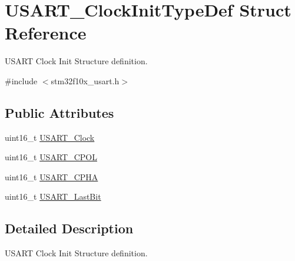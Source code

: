 \hypertarget{structUSART__ClockInitTypeDef}{
\section{USART\_\-ClockInitTypeDef Struct Reference}
\label{structUSART__ClockInitTypeDef}
}


USART Clock Init Structure definition.  




{\ttfamily \#include $<$stm32f10x\_\-usart.h$>$}

\subsection*{Public Attributes}
\begin{DoxyCompactItemize}
\item 
uint16\_\-t \hyperlink{structUSART__ClockInitTypeDef_a229ba7c3f9a4d6d56513e6899f6c6693}{USART\_\-Clock}
\item 
uint16\_\-t \hyperlink{structUSART__ClockInitTypeDef_a01450cba8a40cf9a624b25979dc6aa77}{USART\_\-CPOL}
\item 
uint16\_\-t \hyperlink{structUSART__ClockInitTypeDef_abda3a2172bd5819e1c207dc0d1c822d8}{USART\_\-CPHA}
\item 
uint16\_\-t \hyperlink{structUSART__ClockInitTypeDef_ab1b28d63d2be6e57849666d78a4467bd}{USART\_\-LastBit}
\end{DoxyCompactItemize}


\subsection{Detailed Description}
USART Clock Init Structure definition. 

